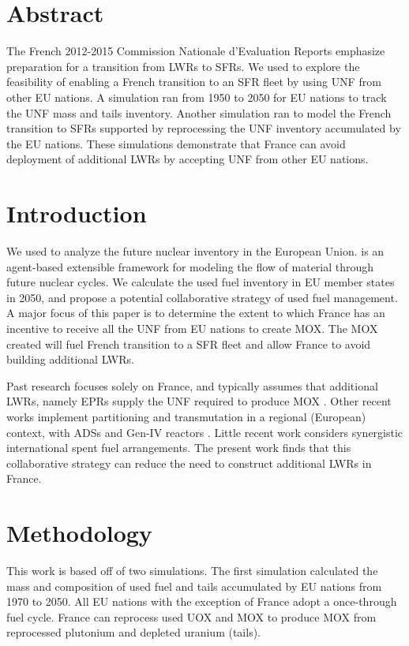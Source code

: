 \section{Abstract}
The French 2012-2015 Commission Nationale d'Evaluation Reports
\cite{cne2_reports_2015} emphasize preparation for a transition from \glspl{LWR} to \glspl{SFR}.
We used \Cyclus \cite{huff_fundamental_2016} to explore the feasibility of enabling a French
transition to an \gls{SFR} fleet by using \gls{UNF} from other \gls{EU} nations.
A \Cyclus simulation ran from 1950 to 2050 for \gls{EU} nations to track the \gls{UNF} mass
and tails inventory. Another simulation ran to model the French
transition to \glspl{SFR} supported by reprocessing the \gls{UNF} inventory accumulated by the \gls{EU} nations.
These simulations demonstrate that France can avoid deployment
of additional \glspl{LWR} by accepting \gls{UNF} from other EU nations.


\section{Introduction}
We used \Cyclus to analyze
the future nuclear inventory in the European Union. \Cyclus is an agent-based extensible
framework for modeling the flow of material through future nuclear cycles.
We calculate the used fuel
inventory in \gls{EU} member states in 2050, and propose a potential collaborative strategy of used fuel
management.
A major focus of this paper is to determine the extent to which France has an incentive
to receive all the \gls{UNF} from \gls{EU} nations to create \gls{MOX}.
The \gls{MOX} created will fuel French transition to a \gls{SFR} fleet
and allow France to avoid building additional \glspl{LWR}.

Past research focuses solely on France, and typically assumes that additional \glspl{LWR},
namely \glspl{EPR} supply the \gls{UNF} required to produce \gls{MOX} \cite{carre_overview_2009, martin_symbiotic_2017, freynet_multiobjective_2016}.
Other recent works implement partitioning and transmutation
in a regional (European) context, with \glspl{ADS} and Gen-IV reactors \cite{fazio_study_2013}.
Little recent work considers synergistic international spent fuel arrangements.
The present work finds that this collaborative strategy can reduce the
need to construct additional \glspl{LWR} in France.

\section{Methodology}
This work is based off of  two \Cyclus simulations. 
The first simulation calculated
the mass and composition of used fuel and tails accumulated by \gls{EU} nations from 1970 to 2050.
All EU nations with the exception of France adopt a once-through fuel cycle.
France can reprocess used \gls{UOX} and \gls{MOX} to
produce \gls{MOX} from reprocessed plutonium and depleted uranium (tails).

